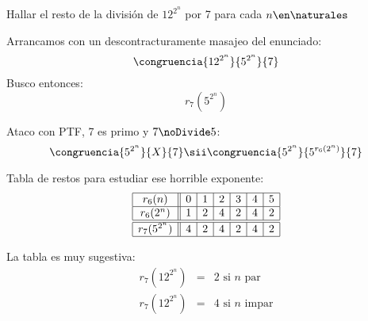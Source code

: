 \begin{enunciado}{\ejExtra}
  Hallar el resto de la división de $12^{2^n}$ por 7 para cada $n \en \naturales$
\end{enunciado}

Arrancamos con un descontracturamente masajeo del enunciado:
$$
  \congruencia{12^{2^n}}{5^{2^n}}{7}
$$
Busco entonces:
$$
  r_7(5^{2^n})
$$

Ataco con PTF, 7 es primo y $7 \noDivide 5$:
$$
  \congruencia{5^{2^n}}{X}{7}
  \sii
  \congruencia{5^{2^n}}{5^{r_6(2^n)}}{7}
$$

Tabla de restos para estudiar ese horrible exponente:
$$
  \begin{array}{|c||c|c|c|c|c|c|}
    \hline
    r_6(n)       & 0 & 1 & 2 & 3 & 4 & 5 \\ \hline
    r_6(2^n)     & 1 & 2 & 4 & 2 & 4 & 2 \\ \hline\hline
    r_7(5^{2^n}) & 4 & 2 & 4 & 2 & 4 & 2 \\ \hline
  \end{array}
$$

La tabla es muy sugestiva:
$$
  \begin{array}{rcl}
    r_7(12^{2^n}) & = & 2 \text{ si } n \text{ par} \\
    r_7(12^{2^n}) & = & 4 \text{ si } n \text{ impar}
  \end{array}
$$

\begin{aportes}
  \item {}
  \item {}
\end{aportes}

